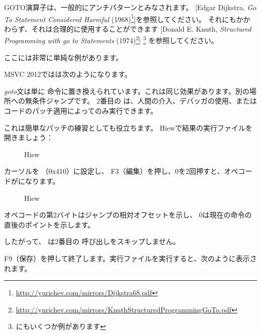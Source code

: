 
GOTO演算子は、一般的にアンチパターンとみなされます。
[Edgar Dijkstra, \emph{Go To Statement Considered Harmful} (1968)\footnote{\url{http://yurichev.com/mirrors/Dijkstra68.pdf}}]を参照してください。 
それにもかかわらず、それは合理的に使用することができます
[Donald E. Knuth, \emph{Structured Programming with go to Statements} (1974)\footnote{\url{http://yurichev.com/mirrors/KnuthStructuredProgrammingGoTo.pdf}}]
\footnote{\InSqBrackets{\CNotes} にもいくつか例があります}
を参照してください。

ここには非常に単純な例があります。



MSVC 2012ではは次のようになります。



\emph{goto}文は単に \JMP 命令に置き換えられています。これは同じ効果があります。別の場所への無条件ジャンプです。 
2番目の \printf は、人間の介入、デバッガの使用、またはコードのパッチ適用によってのみ実行できます。

\par

\clearpage

これは簡単なパッチの練習としても役立ちます。 Hiewで結果の実行ファイルを開きましょう：

\begin{figure}[H]
\centering
{}
\caption{Hiew}
\label{fig:goto_hiew1}
\end{figure}

\clearpage
カーソルを \JMP （0x410）に設定し、
F3（編集）を押し、0を2回押すと、オペコードがになります。

\begin{figure}[H]
\centering
{}
\caption{Hiew}
\label{fig:goto_hiew2}
\end{figure}

\JMP オペコードの第2バイトはジャンプの相対オフセットを示し、
0は現在の命令の直後のポイントを示します。

したがって、 \JMP は2番目の \printf 呼び出しをスキップしません。

F9（保存）を押して終了します。実行ファイルを実行すると、次のように表示されます。



